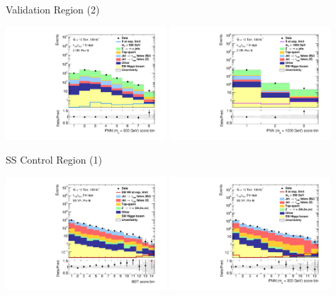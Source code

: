 \documentclass[11pt, xcolor={dvipsnames}, aspectratio=169]{beamer}
\begin{document}
\begin{frame}{ Validation Region (2)}
  \centering

  \includegraphics[width=0.45\textwidth]{vrplots/zvr/Region_BMin0_incJet1_distPNN500_J2_Y2015_DLLOS_T1_SpcTauHH_L0_Prefitlog}%
  \hfill%
  \includegraphics[width=0.45\textwidth]{vrplots/zvr/Region_BMin0_incJet1_distPNN1000_J2_Y2015_DLLOS_T1_SpcTauHH_L0_Prefitlog}
\end{frame}


\begin{frame}{SS Control Region (1)}
  \centering

  \includegraphics[width=0.45\textwidth]{vrplots/ssvr/Region_BMin0_incJet1_distSMBDT_J2_Y2015_DLLSS_T2_SpcTauHH_L0_Prefitlog}%
  \hfill%
  \includegraphics[width=0.45\textwidth]{vrplots/ssvr/Region_BMin0_incJet1_distPNN300_J2_Y2015_DLLSS_T2_SpcTauHH_L0_Prefitlog}
\end{frame}
\end{document}
